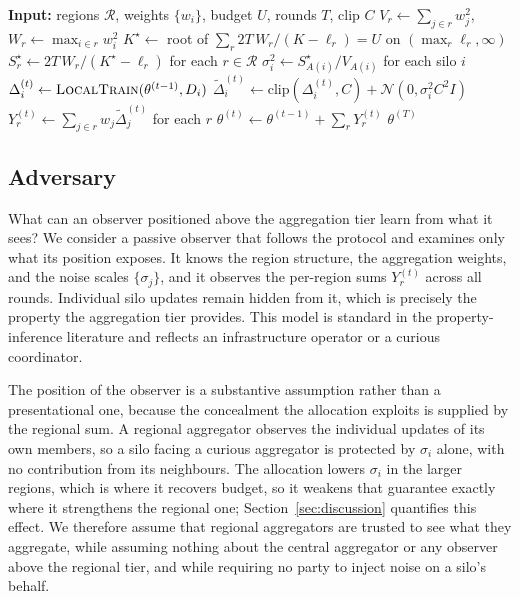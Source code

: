 \documentclass[acmsmall,screen,review,anonymous]{acmart}
\theoremstyle{acmdefinition}%
\newcommand{\Fulcrum}{\textsc{Fulcrum}\xspace}
\newcommand{\Reg}{\mathcal{R}}
\begin{document}
\begin{algorithm}[t]
\caption{\Fulcrum: federated training with min-max optimal regional allocation}
\label{alg:main}
\begin{algorithmic}[1]
\STATE \textbf{Input:} regions $\Reg$, weights $\{w_i\}$, budget $U$, rounds $T$, clip $C$
\STATE $V_r \leftarrow \sum_{j \in r} w_j^2$, \quad $W_r \leftarrow \max_{i \in r} w_i^2$
\STATE $K^\star \leftarrow$ root of $\sum_r 2T\,W_r/(K-\ell_r) = U$ on $(\max_r \ell_r, \infty)$
\STATE $S_r^\star \leftarrow 2T\,W_r/(K^\star - \ell_r)$ \quad for each $r \in \Reg$
\STATE $\sigma_i^2 \leftarrow S_{A(i)}^\star / V_{A(i)}$ \quad for each silo $i$
    \STATE $\Delta_i^{(t)} \leftarrow \textsc{LocalTrain}(\theta^{(t-1)}, D_i)$
    \STATE $\tilde{\Delta}_i^{(t)} \leftarrow \mathrm{clip}(\Delta_i^{(t)}, C) + \mathcal{N}(0, \sigma_i^2 C^2 I)$
  \ENDFOR
  \STATE $Y_r^{(t)} \leftarrow \sum_{j \in r} w_j \tilde{\Delta}_j^{(t)}$ \quad for each $r$
  \STATE $\theta^{(t)} \leftarrow \theta^{(t-1)} + \sum_{r} Y_r^{(t)}$
\ENDFOR
\RETURN $\theta^{(T)}$
\end{algorithmic}
\end{algorithm}

\subsection{Adversary}
\label{sec:adversary}

What can an observer positioned above the aggregation tier learn from what it
sees? We consider a passive observer that follows the protocol and examines only
what its position exposes. It knows the region structure, the aggregation weights,
and the noise scales $\{\sigma_j\}$, and it observes the per-region sums
$Y_r^{(t)}$ across all rounds. Individual silo updates remain hidden from it, which
is precisely the property the aggregation tier provides. This model is standard in
the property-inference literature \cite{melis2019exploiting} and reflects an
infrastructure operator or a curious coordinator.

The position of the observer is a substantive assumption rather than a
presentational one, because the concealment the allocation exploits is supplied by
the regional sum. A regional aggregator observes the individual updates of its own
members, so a silo facing a curious aggregator is protected by $\sigma_i$ alone,
with no contribution from its neighbours. The allocation lowers $\sigma_i$ in the
larger regions, which is where it recovers budget, so it weakens that guarantee
exactly where it strengthens the regional one; Section~\ref{sec:discussion}
quantifies this effect. We therefore assume that regional aggregators are trusted
to see what they aggregate, while assuming nothing about the central aggregator or
any observer above the regional tier, and while requiring no party to inject noise
on a silo's behalf.
\end{document}
